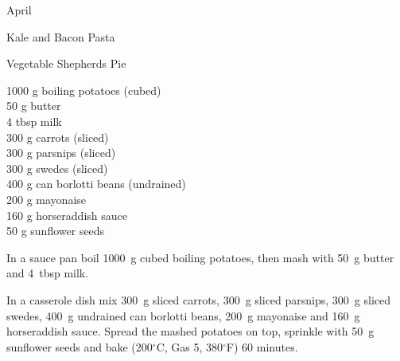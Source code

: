 \begin{menu}{April}
\begin{recipe}{2}{Kale and Bacon Pasta}
\begin{instructions}
    \end{instructions}
    \end{recipe}%
  
    \begin{recipe}{2}{Vegetable Shepherds Pie}%
		\begin{ingredients}
		1000 g boiling potatoes (cubed) \\
	50 g butter  \\
	4 tbsp milk  \\
	300 g carrots (sliced) \\
	300 g parsnips (sliced) \\
	300 g swedes (sliced) \\
	400 g can borlotti beans (undrained) \\
	200 g mayonaise  \\
	160 g horseraddish sauce  \\
	50 g sunflower seeds  \\
	
		\end{ingredients}
	
	
    \begin{instructions}
    \item 
        In a sauce pan boil
        1000~g cubed boiling potatoes,
        then mash with
        50~g  butter
        and
        4~tbsp  milk.
      \item 
        In a casserole dish mix
        300~g sliced carrots,
        300~g sliced parsnips,
        300~g sliced swedes,
        400~g undrained can borlotti beans,
        200~g  mayonaise
        and
        160~g  horseraddish sauce.
        Spread the mashed potatoes on top,
        sprinkle with
        50~g  sunflower seeds
        and
        bake (200$^{\circ}$C, Gas 5, 380$^{\circ}$F) 60 minutes.
      
    \end{instructions}
    \end{recipe}%
  

\end{menu}
